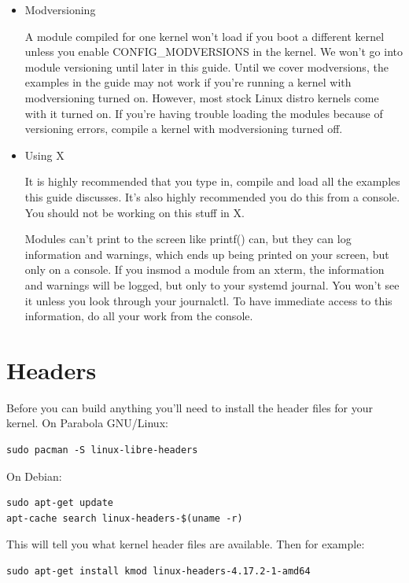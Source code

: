 \documentclass[11pt]{article}
\begin{document}
\begin{itemize}
\item Modversioning
\label{sec-1-8-0-1}

A module compiled for one kernel won't load if you boot a different kernel unless you enable CONFIG\_MODVERSIONS in the kernel. We won't go into module versioning until later in this guide. Until we cover modversions, the examples in the guide may not work if you're running a kernel with modversioning turned on. However, most stock Linux distro kernels come with it turned on. If you're having trouble loading the modules because of versioning errors, compile a kernel with modversioning turned off.

\item Using X
\label{sec-1-8-0-2}

It is highly recommended that you type in, compile and load all the examples this guide discusses. It's also highly recommended you do this from a console. You should not be working on this stuff in X.

Modules can't print to the screen like printf() can, but they can log information and warnings, which ends up being printed on your screen, but only on a console. If you insmod a module from an xterm, the information and warnings will be logged, but only to your systemd journal. You won't see it unless you look through your journalctl. To have immediate access to this information, do all your work from the console.
\end{itemize}

\section*{Headers}
\label{sec-2}
Before you can build anything you'll need to install the header files for your kernel. On Parabola GNU/Linux:

\begin{verbatim}
sudo pacman -S linux-libre-headers
\end{verbatim}

On Debian:

\begin{verbatim}
sudo apt-get update
apt-cache search linux-headers-$(uname -r)
\end{verbatim}

This will tell you what kernel header files are available. Then for example:

\begin{verbatim}
sudo apt-get install kmod linux-headers-4.17.2-1-amd64
\end{verbatim}
\end{document}
